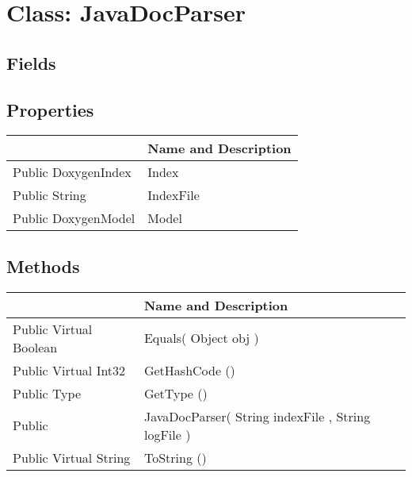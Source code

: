 \documentclass[11pt, oneside, a4paper]{book}
\begin{document}
\hypertarget{SoftwareEngineeringTools.{}Documentation.{}JavaDocParser}{}
\section{Class: JavaDocParser}

\subsection{Fields}

\subsection{Properties}
\begin{center}
\begin{tabular}{| p{3cm} | p{12cm} | }
\hline
\textbf{ } & \textbf{ Name and Description}\\
\hline
 Public  DoxygenIndex &  Index\hypertarget{SoftwareEngineeringTools.{}Documentation.{}JavaDocParser.{}Index}{}\\
\hline
 Public  String &  IndexFile\hypertarget{SoftwareEngineeringTools.{}Documentation.{}JavaDocParser.{}IndexFile}{}\\
\hline
 Public  DoxygenModel &  Model\hypertarget{SoftwareEngineeringTools.{}Documentation.{}JavaDocParser.{}Model}{}\\
\hline
\end{tabular}
\end{center}

\subsection{Methods}
\begin{center}
\begin{tabular}{| p{3cm} | p{12cm} | }
\hline
\textbf{ } & \textbf{ Name and Description}\\
\hline
 Public  Virtual  Boolean &  Equals(\hypertarget{SoftwareEngineeringTools.{}Documentation.{}JavaDocParser.{}Equals\_Object}{} Object  obj  )\\
\hline
 Public  Virtual  Int32 &  GetHashCode ()\hypertarget{SoftwareEngineeringTools.{}Documentation.{}JavaDocParser.{}GetHashCode}{}\\
\hline
 Public  Type &  GetType ()\hypertarget{SoftwareEngineeringTools.{}Documentation.{}JavaDocParser.{}GetType}{}\\
\hline
 Public  &  JavaDocParser(\hypertarget{SoftwareEngineeringTools.{}Documentation.{}JavaDocParser.{}JavaDocParser\_String\_String}{} String  indexFile  ,  String  logFile  )\\
\hline
 Public  Virtual  String &  ToString ()\hypertarget{SoftwareEngineeringTools.{}Documentation.{}JavaDocParser.{}ToString}{}\\
\hline
\end{tabular}
\end{center}
 
\end{document}

